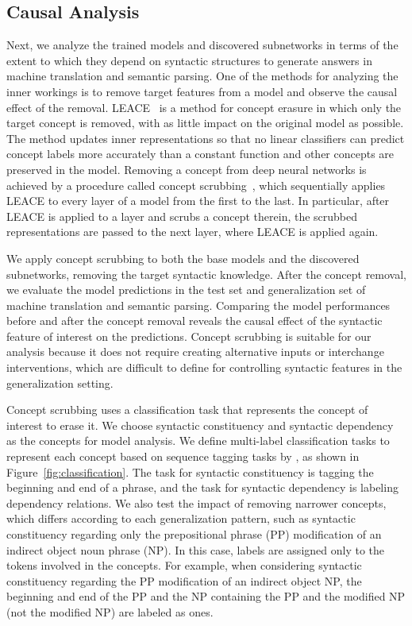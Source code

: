 
\subsection{Causal Analysis}
\label{subsec:causal}
Next, we analyze the trained models and discovered subnetworks in terms of the extent to which they depend on syntactic structures to generate answers in machine translation and semantic parsing.
One of the methods for analyzing the inner workings is to remove target features from a model and observe the causal effect of the removal.
LEACE~\citep{belrose2023leace} is a method for concept erasure in which only the target concept is removed, with as little impact on the original model as possible.
The method updates inner representations so that no linear classifiers can predict concept labels more accurately than a constant function and other concepts are preserved in the model.
Removing a concept from deep neural networks is achieved by a procedure called concept scrubbing~\citep{belrose2023leace}, which sequentially applies LEACE to every layer of a model from the first to the last.
In particular, after LEACE is applied to a layer and scrubs a concept therein, the scrubbed representations are passed to the next layer, where LEACE is applied again.

We apply concept scrubbing to both the base models and the discovered subnetworks, removing the target syntactic knowledge.
After the concept removal, we evaluate the model predictions in the test set and generalization set of machine translation and semantic parsing.
Comparing the model performances before and after the concept removal reveals the causal effect of the syntactic feature of interest on the predictions.
Concept scrubbing is suitable for our analysis because it does not require creating alternative inputs or interchange interventions, which are difficult to define for controlling syntactic features in the generalization setting.

Concept scrubbing uses a classification task that represents the concept of interest to erase it.
We choose syntactic constituency and syntactic dependency as the concepts for model analysis.
We define multi-label classification tasks to represent each concept based on sequence tagging tasks by \citet{elazar-etal-2021-amnesic}, as shown in Figure~\ref{fig:classification}.
The task for syntactic constituency is tagging the beginning and end of a phrase, and the task for syntactic dependency is labeling dependency relations.
We also test the impact of removing narrower concepts, which differs according to each generalization pattern, such as syntactic constituency regarding only the prepositional phrase (PP) modification of an indirect object noun phrase (NP).
In this case, labels are assigned only to the tokens involved in the concepts.
For example, when considering syntactic constituency regarding the PP modification of an indirect object NP, the beginning and end of the PP and the NP containing the PP and the modified NP (not the modified NP) are labeled as ones.

